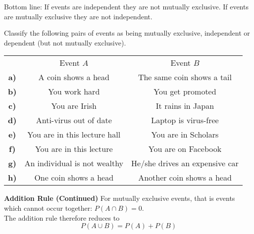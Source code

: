 \documentclass[]{report}
\begin{document}
Bottom line: If events are independent they are not mutually exclusive. If events are mutually exclusive they are not independent.





Classify the following pairs of events as being mutually exclusive, independent or dependent (but not mutually exclusive).\\

\begin{tabular}{ccc}
& Event $A$ & Event $B$ \\
\textbf{a)} &  A coin shows a head   & The same coin shows a tail \\
\textbf{b)} &  You work hard   & You get promoted \\
\textbf{c)} &  You are Irish  & It rains in Japan \\
\textbf{d)} &  Anti-virus out of date  & Laptop is virus-free \\
\textbf{e)} &  You are in this lecture hall   & You are in  Scholars \\
\textbf{f)} &  You are in this lecture   & You are on Facebook \\
\textbf{g)} &  An individual is not wealthy   & He/she drives an expensive car  \\
\textbf{h)} &  One coin shows a head   & Another coin shows a head
\end{tabular}

{
\textbf{Addition Rule (Continued)}
For mutually exclusive events, that is events which cannot occur together:
$P(A\cap B) = 0$.\\ \medskip The addition rule therefore reduces to
\[ P(A\cup B) = P(A) + P(B)\]
}
\end{document}
